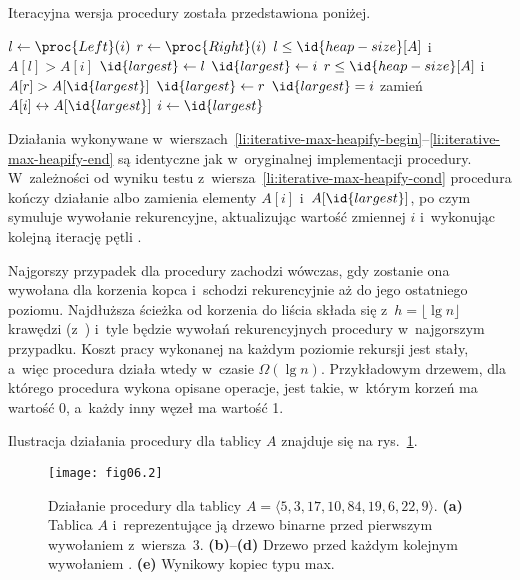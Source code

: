 \exercise %
Iteracyjna wersja procedury  została przedstawiona poniżej.
\begin{codebox}
\li	\While {}
\li		\Do
			$l\gets\proc{Left}(i)$ \label{li:iterative-max-heapify-begin}
\li			$r\gets\proc{Right}(i)$
\li			\If $l\le\id{heap-size}[A]$ i~$A[l]>A[i]$
\li				\Then $\id{largest}\gets l$
\li				\Else $\id{largest}\gets i$
				\End
\li			\If $r\le\id{heap-size}[A]$ i~$A[r]>A[\id{largest}]$
\li				\Then $\id{largest}\gets r$
				\End \label{li:iterative-max-heapify-end}
\li			\If $\id{largest}=i$ \label{li:iterative-max-heapify-cond}
\li				\Then \Return
				\End
\li			zamień $A[i]\leftrightarrow A[\id{largest}]$
\li			$i\gets\id{largest}$
		\End
\end{codebox}
Działania wykonywane w~wierszach~\ref{li:iterative-max-heapify-begin}\nobreakdash--\ref{li:iterative-max-heapify-end} są identyczne jak w~oryginalnej implementacji procedury. W~zależności od wyniku testu z~wiersza~\ref{li:iterative-max-heapify-cond} procedura kończy działanie albo zamienia elementy $A[i]$ i~$A[\id{largest}]$, po czym symuluje wywołanie rekurencyjne, aktualizując wartość zmiennej $i$ i~wykonując kolejną iterację pętli .

\exercise %
Najgorszy przypadek dla procedury  zachodzi wówczas, gdy zostanie ona wywołana dla korzenia kopca i~schodzi rekurencyjnie aż do jego ostatniego poziomu. Najdłuższa ścieżka od korzenia do liścia składa się z~$h=\lfloor\lg n\rfloor$ krawędzi (z~) i~tyle będzie wywołań rekurencyjnych procedury w~najgorszym przypadku. Koszt pracy wykonanej na każdym poziomie rekursji jest stały, a~więc procedura  działa wtedy w~czasie $\Omega(\lg n)$. Przykładowym drzewem, dla którego procedura wykona opisane operacje, jest takie, w~którym korzeń ma wartość 0, a~każdy inny węzeł ma wartość 1.


\exercise %
Ilustracja działania procedury  dla tablicy $A$ znajduje się na rys.~\ref{fig:6.3-1}.
\begin{figure}[ht!]
	\begin{center}
		\texttt{[image: fig06.2]}
	\end{center}
	\caption{Działanie procedury  dla tablicy $A=\langle5,3,17,10,84,19,6,22,9\rangle$. {\sffamily\bfseries(a)} Tablica $A$ i~reprezentujące ją drzewo binarne przed pierwszym wywołaniem  z~wiersza~3. {\sffamily\bfseries(b)}--{\sffamily\bfseries(d)} Drzewo przed każdym kolejnym wywołaniem . {\sffamily\bfseries(e)} Wynikowy kopiec typu max.} \label{fig:6.3-1}
\end{figure}

